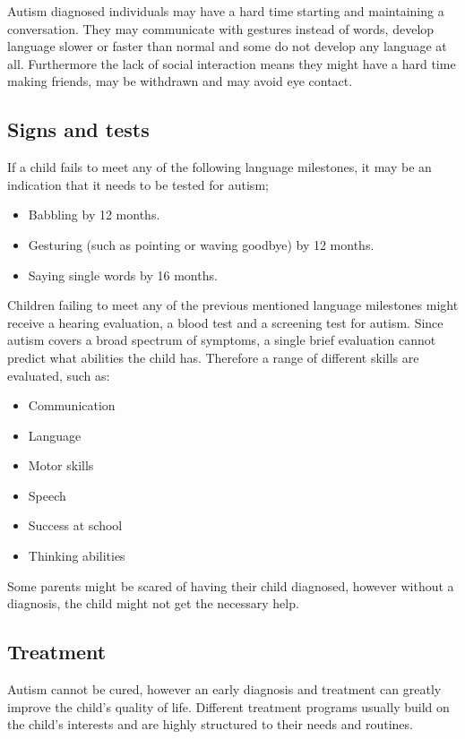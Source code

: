 Autism diagnosed individuals may have a hard time starting and maintaining a conversation. They may communicate with gestures instead of words, develop language slower or faster than normal and some do not develop any language at all.
Furthermore the lack of social interaction means they might have a hard time making friends, may be withdrawn and may avoid eye contact.\citep{autism}

\subsection*{Signs and tests}
\label{sub:signsAndTests}
If a child fails to meet any of the following language milestones, it may be an indication that it needs to be tested for autism;

\begin{itemize}
\item Babbling by 12 months.
\item Gesturing (such as pointing or waving goodbye) by 12 months.
\item Saying single words by 16 months.
\end{itemize}

Children failing to meet any of the previous mentioned language milestones might receive a hearing evaluation, a blood test and a screening test for autism. Since autism covers a broad spectrum of symptoms, a single brief evaluation cannot predict what abilities the child has. Therefore a range of different skills are evaluated, such as:

\begin{itemize}
\item Communication
\item Language
\item Motor skills
\item Speech
\item Success at school
\item Thinking abilities
\end{itemize}

Some parents might be scared of having their child diagnosed, %
however without a diagnosis, the child might not get the necessary help.\citep{autism}

\subsection*{Treatment}
\label{sub:treatment}
Autism cannot be cured, however an early diagnosis and treatment can greatly improve the child's quality of life. Different treatment programs usually build on the child's interests and are highly structured to their needs and routines.\citep{autism}
